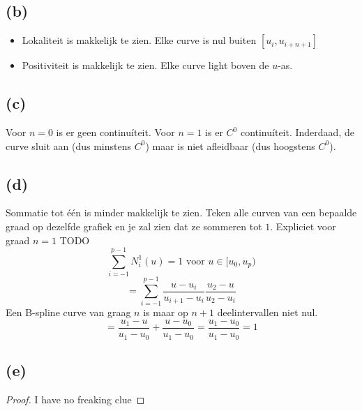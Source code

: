 \documentclass[10pt,a4paper]{article}
\begin{document}
\subsection*{(b)}
\begin{itemize}
\item Lokaliteit is makkelijk te zien. Elke curve is nul buiten $[u_i,u_{i+n+1}]$
\item Positiviteit is makkelijk te zien. Elke curve light boven de $u$-as.
\end{itemize}

\subsection*{(c)}
Voor $n=0$ is er geen continu\'iteit. Voor $n=1$ is er $C^{0}$ continu\'iteit. Inderdaad, de curve sluit aan (dus minstens $C^0$) maar is niet afleidbaar (dus hoogstens $C^0$).

\subsection*{(d)}
Sommatie tot \'e\'en is minder makkelijk te zien. Teken alle curven van een bepaalde graad op dezelfde grafiek en je zal zien dat ze sommeren tot $1$.
Expliciet voor graad $n=1$ TODO
\[
\sum_{i=-1}^{p-1}N_{i}^{1}(u) = 1 \text{ voor } u\in [u_0,u_p)
\]
\[
=\sum_{i=-1}^{p-1}
\frac{u-u_i}{u_{i+1}-u_i}\frac{u_2-u}{u_2-u_i} 
\]
Een B-spline curve van graag $n$ is maar op $n+1$ deelintervallen niet nul. 
\[
= \frac{u_1-u}{u_1-u_0}
+ \frac{u-u_{0}}{u_{1}-u_{0}}
=
\frac{u_1-u_0}{u_1-u_0}
= 1
\]

\subsection*{(e)}
\begin{proof}
I have no freaking clue
\end{proof}



\end{document}
